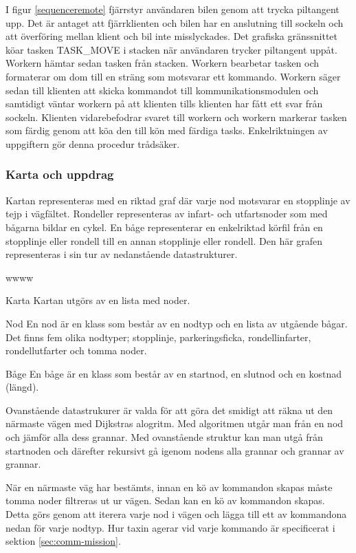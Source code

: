\documentclass[tekniskrapport/tech.tex]{subfiles}
\begin{document}
I figur \ref{sequenceremote} fjärrstyr användaren bilen genom att trycka
piltangent upp. Det är antaget att fjärrklienten och bilen har en anslutning
till sockeln och att överföring mellan klient och bil inte misslyckades. Det
grafiska gränssnittet köar tasken TASK_MOVE i stacken när användaren trycker
piltangent uppåt. Workern hämtar sedan tasken från stacken. Workern bearbetar
tasken och formaterar om dom till en sträng som motsvarar ett kommando. Workern
säger sedan till klienten att skicka kommandot till kommunikationsmodulen och
samtidigt väntar workern på att klienten tills klienten har fått ett svar från
sockeln. Klienten vidarebefodrar svaret till workern och workern markerar tasken
som färdig genom att köa den till kön med färdiga tasks. Enkelriktningen av uppgiftern
gör denna procedur trådsäker.


\subsubsection{Karta och uppdrag}
\label{sec:mission}
Kartan representeras med en riktad graf där varje nod motsvarar en stopplinje
av tejp i vägfältet. Rondeller representeras av infart- och utfartsnoder som
med bågarna bildar en cykel. En båge representerar en enkelriktad körfil från
en stopplinje eller rondell till en annan stopplinje eller rondell. Den här
grafen representeras i sin tur av nedanstående datastrukturer.

\begin{labeling}{wwww}
    \item[Karta] Kartan utgörs av en lista med noder.

    \item[Nod] En nod är en klass som består av en nodtyp och en lista
        av utgående bågar. Det finns fem olika nodtyper; stopplinje,
        parkeringsficka, rondellinfarter, rondellutfarter och tomma noder. 

    \item[Båge] En båge är en klass som består av en startnod, en slutnod och
    en kostnad (längd).
        
\end{labeling}
Ovanstående datastrukurer är valda för att göra det smidigt att räkna ut den
närmaste vägen med Dijkstras alogritm. Med algoritmen utgår man från en nod och
jämför alla dess grannar. Med ovanstående struktur kan man utgå från startnoden
och därefter rekursivt gå igenom nodens alla grannar och grannar av grannar.

När en närmaste väg har bestämts, innan en kö av kommandon skapas måste tomma
noder filtreras ut ur vägen. Sedan kan en kö av kommandon skapas. Detta görs
genom att iterera varje nod i vägen och lägga till ett av kommandona nedan för
varje nodtyp. Hur taxin agerar vid varje kommando är specificerat i sektion
\ref{sec:comm-mission}.
\end{document}
